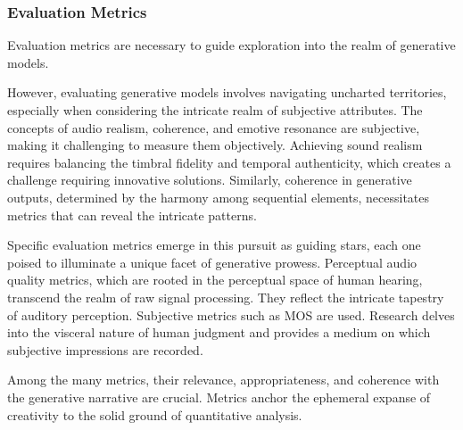 \subsubsection{Evaluation Metrics}

Evaluation metrics are necessary to guide exploration into the realm of generative models.

However, evaluating generative models involves navigating uncharted territories, especially when considering the intricate realm of subjective attributes. The concepts of audio realism, coherence, and emotive resonance are subjective, making it challenging to measure them objectively. Achieving sound realism requires balancing the timbral fidelity and temporal authenticity, which creates a challenge requiring innovative solutions. Similarly, coherence in generative outputs, determined by the harmony among sequential elements, necessitates metrics that can reveal the intricate patterns.

Specific evaluation metrics emerge in this pursuit as guiding stars, each one poised to illuminate a unique facet of generative prowess. Perceptual audio quality metrics, which are rooted in the perceptual space of human hearing, transcend the realm of raw signal processing. They reflect the intricate tapestry of auditory perception. Subjective metrics such as \ac{MOS} are used. Research delves into the visceral nature of human judgment and provides a medium on which subjective impressions are recorded.

Among the many metrics, their relevance, appropriateness, and coherence with the generative narrative are crucial. Metrics anchor the ephemeral expanse of creativity to the solid ground of quantitative analysis.